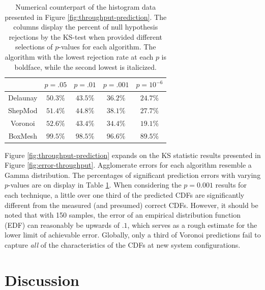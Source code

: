 \documentclass[smallextended,final]{svjour3}       %
\begin{document}
\begin{table}
  \renewcommand{\arraystretch}{1.3}
  \centering
  \begin{tabular}{c|c|c|c|c}
     & $p = .05$ & $p = .01$ & $p = .001$ & $p = 10^{-6}$\\
    \hline
    Delaunay & $\mathbf{50.3}\%$ & $\mathit{43.5}\%$ & $\mathit{36.2}\%$ & $\mathit{24.7}\%$\\
    ShepMod & $\mathit{51.4}\%$ & $44.8\%$ & $38.1\%$ & $27.7\%$\\
    Voronoi & $52.6\%$ & $\mathbf{43.4}\%$ & $\mathbf{34.4}\%$ & $\mathbf{19.1}\%$\\
    BoxMesh & $99.5\%$ & $98.5\%$ & $96.6\%$ & $89.5\%$\\
  \end{tabular}
  \caption{Numerical counterpart of the histogram data presented in Figure
  \ref{fig:throughput-prediction}. The columns display the percent of null
  hypothesis rejections by the KS-test when provided different selections
  of $p$-values for each algorithm. The algorithm with the lowest rejection
  rate at each $p$ is boldface, while the second lowest is italicized.}

 \label{table:null-hypothesis-results}
\end{table}



Figure \ref{fig:throughput-prediction} expands on the KS statistic results
presented in Figure \ref{fig:error-throughput}. Agglomerate errors for
each algorithm resemble a Gamma distribution. The percentages of significant
prediction errors with varying $p$-values are on display in Table
\ref{table:null-hypothesis-results}. When considering the $p=0.001$ results
for each technique, a little over one third of the predicted CDFs are
significantly different from the measured (and presumed) correct CDFs.
However, it should be noted that with 150 samples, the error of an empirical
distribution function (EDF) can reasonably be upwards of $.1$, which serves
as a rough estimate for the lower limit of achievable error. Globally,
only a third of Voronoi predictions fail to capture \textit{all} of the
characteristics of the CDFs at new system configurations.

\section{Discussion}
\label{sec:discussion}
\end{document}
